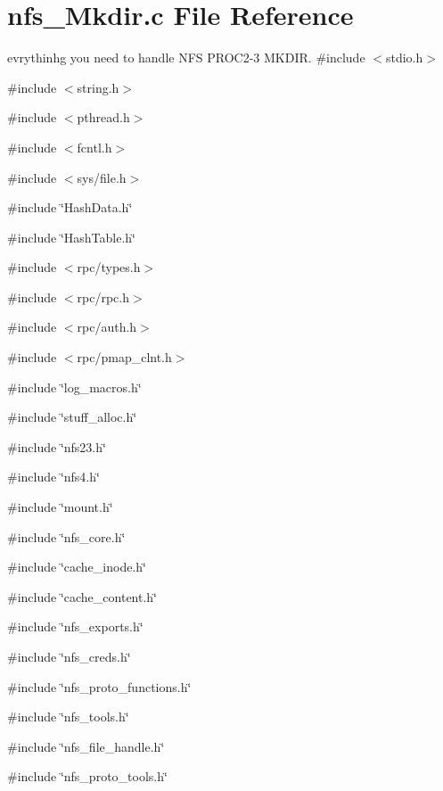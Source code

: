 \section{nfs\_\-Mkdir.c File Reference}
\label{nfs__Mkdir_8c}


evrythinhg you need to handle NFS PROC2-\/3 MKDIR.  
{\ttfamily \#include $<$stdio.h$>$}\par
{\ttfamily \#include $<$string.h$>$}\par
{\ttfamily \#include $<$pthread.h$>$}\par
{\ttfamily \#include $<$fcntl.h$>$}\par
{\ttfamily \#include $<$sys/file.h$>$}\par
{\ttfamily \#include \char`\"{}HashData.h\char`\"{}}\par
{\ttfamily \#include \char`\"{}HashTable.h\char`\"{}}\par
{\ttfamily \#include $<$rpc/types.h$>$}\par
{\ttfamily \#include $<$rpc/rpc.h$>$}\par
{\ttfamily \#include $<$rpc/auth.h$>$}\par
{\ttfamily \#include $<$rpc/pmap\_\-clnt.h$>$}\par
{\ttfamily \#include \char`\"{}log\_\-macros.h\char`\"{}}\par
{\ttfamily \#include \char`\"{}stuff\_\-alloc.h\char`\"{}}\par
{\ttfamily \#include \char`\"{}nfs23.h\char`\"{}}\par
{\ttfamily \#include \char`\"{}nfs4.h\char`\"{}}\par
{\ttfamily \#include \char`\"{}mount.h\char`\"{}}\par
{\ttfamily \#include \char`\"{}nfs\_\-core.h\char`\"{}}\par
{\ttfamily \#include \char`\"{}cache\_\-inode.h\char`\"{}}\par
{\ttfamily \#include \char`\"{}cache\_\-content.h\char`\"{}}\par
{\ttfamily \#include \char`\"{}nfs\_\-exports.h\char`\"{}}\par
{\ttfamily \#include \char`\"{}nfs\_\-creds.h\char`\"{}}\par
{\ttfamily \#include \char`\"{}nfs\_\-proto\_\-functions.h\char`\"{}}\par
{\ttfamily \#include \char`\"{}nfs\_\-tools.h\char`\"{}}\par
{\ttfamily \#include \char`\"{}nfs\_\-file\_\-handle.h\char`\"{}}\par
{\ttfamily \#include \char`\"{}nfs\_\-proto\_\-tools.h\char`\"{}}\par
